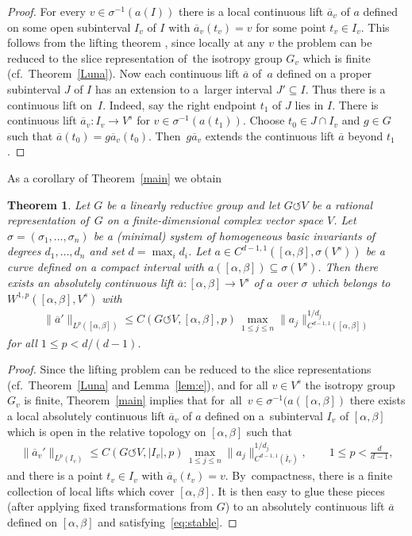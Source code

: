 \documentclass[pdftex]{sigma}
\numberwithin{equation}{section}
\newtheorem{Theorem}{Theorem}[section]
\def\al{\alpha}
\def\be{\beta}
\def\si{\sigma}
\def\ol{\overline}
\def\acts{\circlearrowleft}
\begin{document}
\begin{proof}
 For every $v \in \si^{-1}(a(I))$ there is a local continuous lift $\ol a_v$ of $a$ defined on some
 open subinterval $I_v$ of $I$ with $\ol a_v(t_v) = v$ for some point $t_v \in I_v$. This follows from the
 lifting theorem \cite[Theorem 5.1]{LMRac}, since locally at any $v$ the problem can be reduced to the
 slice representation of~the isotropy group $G_v$ which is finite (cf.\ Theorem~\ref{Luna}).
 Now each continuous lift $\ol a$ of~$a$ defined on a proper subinterval $J$ of $I$ has an extension to a~larger interval $J' \subseteq I$. Thus there is a continuous lift on~$I$.
 Indeed, say the right endpoint $t_1$ of $J$ lies in $I$.
 There is continuous lift $\ol a_v \colon I_v \to V^s$ for $v \in \si^{-1}(a(t_1))$.
 Choose $t_0 \in J \cap I_v$ and $g \in G$ such that $\ol a(t_0) = g \ol a_v(t_0)$.
 Then~$g \ol a_v$ extends the continuous lift $\ol a$ beyond $t_1$.
\end{proof}

As a corollary of Theorem~\ref{main} we obtain

\begin{Theorem}
 Let $G$ be a linearly reductive group and let $G \acts V$ be a rational representation of~$G$ on a finite-dimensional
 complex vector space $V$. Let $\si=(\si_1,\dots,\si_n)$ be a (minimal) system of homogeneous
 basic invariants of degrees $d_1,\dots,d_n$ and set $d = \max_i d_i$.
 Let $a \in C^{d-1,1}([\al,\be],\si(V^s))$ be a curve defined on a compact interval with
 $a([\al,\be]) \subseteq \si(V^s)$.
 Then there exists an absolutely continuous lift
 $\overline a \colon [\al,\be] \to V^s$ of $a$ over $\si$ which
 belongs to $W^{1,p}([\al,\be],V^s)$
 with
 \begin{gather} \label{eq:stable}
 \|\ol a'\|_{L^p([\al,\be])} \le
 C(G \acts V,[\al,\be],p)\, \max_{1 \le j \le n} \|a_j\|^{1/d_j}_{C^{d-1,1}([\al, \be])}
 \end{gather}
 for all $1 \le p < d/(d-1)$.
\end{Theorem}


\begin{proof}
 Since the lifting problem can be reduced to the slice representations (cf.\ Theorem~\ref{Luna} and Lemma~\ref{lem:e}), and for all $v \in V^s$
 the isotropy group $G_v$ is finite, Theorem~\ref{main} implies that for~all~$v \in \si^{-1}(a([\al,\be])$
 there exists a local absolutely continuous lift $\ol a_v$ of $a$ defined on a~sub\-in\-ter\-val $I_v$ of $[\al,\be]$ which is open in the relative topology on $[\al,\be]$ such that
 \begin{gather*}
 \|\ol a_v'\|_{L^p(I_v)} \le
 C(G \acts V,|I_v|,p)\, \max_{1 \le j \le n} \|a_j\|^{1/d_j}_{C^{d-1,1}(\ol I_v)}, \qquad 1
 \le p < \frac{d}{d-1},
 \end{gather*}
 and there is a point $t_v \in I_v$ with $\ol a_v(t_v) = v$. By~compactness, there is a finite collection of local lifts which cover $[\al,\be]$.
 It is then easy to glue these pieces (after applying fixed transformations from $G$)
 to an absolutely continuous lift $\ol a$ defined on $[\al,\be]$ and satisfying~\eqref{eq:stable}.
\end{proof}
\end{document}

